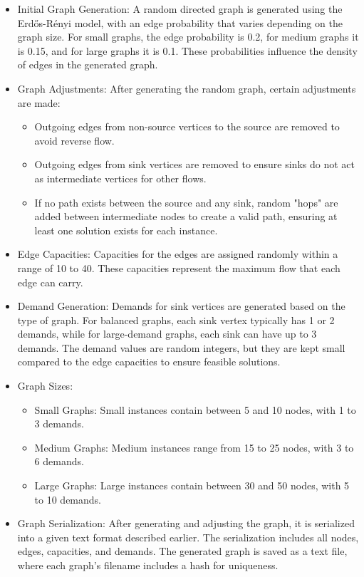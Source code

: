 \documentclass[a4paper,12pt]{article}
\begin{document}
\begin{itemize}
    \item Initial Graph Generation: A random directed graph is generated using the Erdős-Rényi model, with an edge probability that varies depending on the graph size. For small graphs, the edge probability is 0.2, for medium graphs it is 0.15, and for large graphs it is 0.1. These probabilities influence the density of edges in the generated graph.
    
    \item Graph Adjustments: After generating the random graph, certain adjustments are made:
    \begin{itemize}
        \item Outgoing edges from non-source vertices to the source are removed to avoid reverse flow.
        \item Outgoing edges from sink vertices are removed to ensure sinks do not act as intermediate vertices for other flows.
        \item If no path exists between the source and any sink, random "hops" are added between intermediate nodes to create a valid path, ensuring at least one solution exists for each instance.
    \end{itemize}
    
    \item Edge Capacities: Capacities for the edges are assigned randomly within a range of 10 to 40. These capacities represent the maximum flow that each edge can carry.
    
    \item Demand Generation: Demands for sink vertices are generated based on the type of graph. For balanced graphs, each sink vertex typically has 1 or 2 demands, while for large-demand graphs, each sink can have up to 3 demands. The demand values are random integers, but they are kept small compared to the edge capacities to ensure feasible solutions.
    
    \item Graph Sizes:
    \begin{itemize}
        \item Small Graphs: Small instances contain between 5 and 10 nodes, with 1 to 3 demands.
        \item Medium Graphs: Medium instances range from 15 to 25 nodes, with 3 to 6 demands.
        \item Large Graphs: Large instances contain between 30 and 50 nodes, with 5 to 10 demands.
    \end{itemize}
    
    \item Graph Serialization: After generating and adjusting the graph, it is serialized into a given text format described earlier. The serialization includes all nodes, edges, capacities, and demands. The generated graph is saved as a text file, where each graph's filename includes a hash for uniqueness.
    
\end{itemize}
\end{document}
